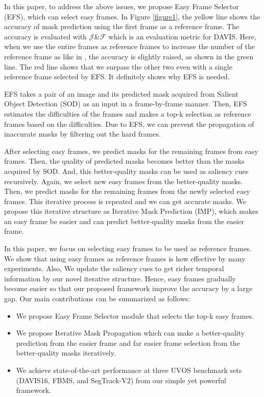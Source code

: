 \documentclass[letterpaper]{article} \usepackage{aaai22}  \usepackage{times}  \usepackage{helvet}  \usepackage{courier}  \usepackage[hyphens]{url}  \usepackage{graphicx} \urlstyle{rm} \def\UrlFont{\rm}  \usepackage{natbib}  \usepackage{caption} \DeclareCaptionStyle{ruled}{labelfont=normalfont,labelsep=colon,strut=off} \frenchspacing  \setlength{\pdfpagewidth}{8.5in}  \setlength{\pdfpageheight}{11in}  \usepackage{algorithm}
\begin{document}
In this paper, to address the above issues, we propose Easy Frame Selector (EFS), which can select easy frames. In Figure \ref{figure1}, the yellow line shows the accuracy of mask prediction using the first frame as a reference frame. The accuracy is evaluated with $\mathcal{J}$\&$\mathcal{F}$ which is an evaluation metric for DAVIS. Here, when we use the entire frames as reference frames to increase the number of the reference frame as like in \citet{song2018pyramid,wang2019learning,faisal2019exploiting}, the accuracy is slightly raised, as shown in the green line. 
The red line shows that we surpass the other two even with a single reference frame selected by EFS. It definitely shows why EFS is needed.

EFS takes a pair of an image and its predicted mask acquired from Salient Object Detection (SOD) as an input in a frame-by-frame manner. Then, EFS estimates the difficulties of the frames and makes a top-k selection as reference frames based on the difficulties. Due to EFS, we can prevent the propagation of inaccurate masks by filtering out the hard frames.

After selecting easy frames, we predict masks for the remaining frames from easy frames. 
Then, the quality of predicted masks becomes better than the masks acquired by SOD. And, this better-quality masks can be used as saliency cues recursively. Again, we select new easy frames from the better-quality masks. Then, we predict masks for the remaining frames from the newly selected easy frames. This iterative process is repeated and we can get accurate masks. We propose this iterative structure as Iterative Mask Prediction (IMP), which makes an easy frame be easier and can predict better-quality masks from the easier frame. 

In this paper, we focus on selecting easy frames to be used as reference frames. We show that using easy frames as reference frames is how effective by many experiments. Also, We update the saliency cues to get richer temporal information by our novel iterative structure. Hence, easy frames gradually become easier so that our proposed framework improve the accuracy by a large gap. Our main contributions can be summarized as follows:

\begin{itemize}
\item We propose Easy Frame Selector module that selects the top-k easy frames. 
\item We propose Iterative Mask Propagation which can make a better-quality prediction from the easier frame and far easier frame selection from the better-quality masks iteratively. 
\item We achieve state-of-the-art performance at three UVOS benchmark sets (DAVIS16, FBMS, and SegTrack-V2) from our simple yet powerful framework.
\end{itemize}
\end{document}
